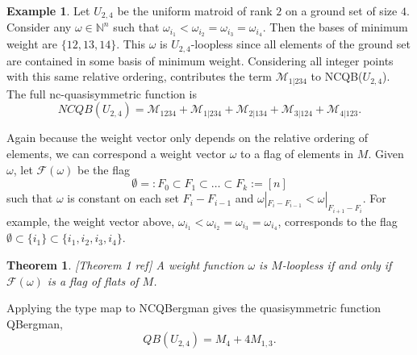\documentclass[12pt,reqno]{amsart}
\numberwithin{definition}{section}
\newtheorem{theorem}[definition]{Theorem}
\theoremstyle{definition}
\newtheorem{example}[definition]{Example}
\newcommand{\om}{\omega}
\newcommand{\ncM}{\mathcal{M}}
\begin{document}
\begin{example}

Let $U_{2,4}$ be the uniform matroid of rank $2$ on a ground set of
size $4$.  Consider any $\omega \in \mathbb{N}^n$ such that
$\omega_{i_1} < \omega_{i_2} = \omega_{i_3} = \omega_{i_4}$.  Then the
bases of minimum weight are $\{12, 13, 14\}$.  This $\omega$ is
$U_{2,4}$-loopless since all elements of the ground set are contained
in some basis of minimum weight.  Considering all integer points with this same relative ordering,  contributes the term
${\ncM}_{1|234}$ to NCQB($U_{2,4}$).  The full nc-quasisymmetric function
is
$$NCQB(U_{2,4})  = {\ncM}_{1234} + {\ncM}_{1|234} + {\ncM}_{2|134} + {\ncM}_{3|124} + {\ncM}_{4|123}. $$

\end{example}


Again because the weight vector only depends on the relative ordering
of elements, we can correspond a weight vector $\om$ to a flag of
elements in $M$.  Given $\om$, let $\mathcal{F}(\om)$ be the flag
$$\emptyset =: F_0 \subset F_1 \subset \ldots \subset F_k := [n]$$
such that $\om$ is constant on each set $F_i - F_{i-1}$ and $\om|_{F_i -
  F_{i-1}} < \om|_{F_{i+1} - F_{i}} $.  For example, the weight vector
above, $\om_{i_1} < \om_{i_2} = \om_{i_3} = \om_{i_4}$, corresponds to
the flag ${\emptyset \subset \{i_1\} \subset \{i_1,i_2,i_3,i_4\}}$.

\begin{theorem}\label{thm:Bergman}[Theorem 1 ref]
A weight function $\omega$ is $M$-loopless if and only if $\mathcal{F}(\om)$ is a flag of flats of $M$.
\end{theorem}


Applying the type map to NCQBergman gives the quasisymmetric
function QBergman, 
$$QB(U_{2,4}) = M_4 + 4M_{1,3}.$$
\end{document}
